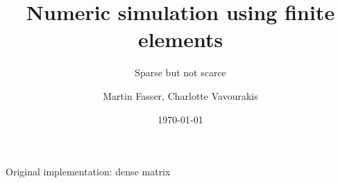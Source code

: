 \documentclass[aspectratio=169,xcolor=dvipsnames]{beamer}
\title[short title]{Numeric simulation using finite elements}
\subtitle{Sparse but not scarce}
\author {Martin Fasser, Charlotte Vavourakis}
\institute[UIBK] %
{
    University of Innsbruck
    \vskip 3pt
}
\date{\today} %
\begin{document}
\begin{frame}
    \titlepage
\end{frame}




\begin{frame}{Original implementation: dense matrix}
    \begin{center}
    \end{center}
\end{frame}
\end{document}
